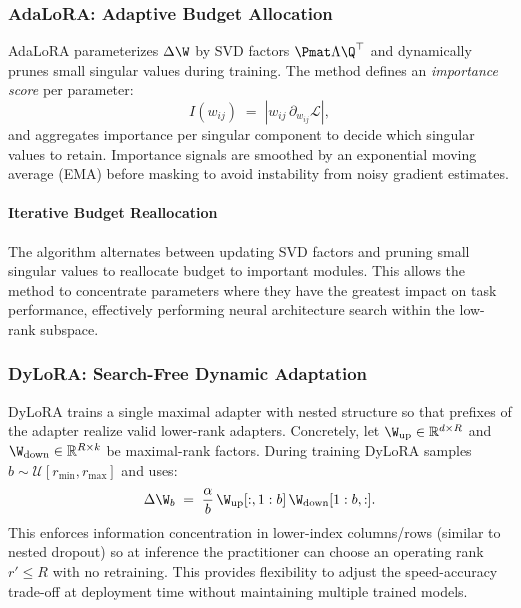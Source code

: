 \subsubsection{AdaLoRA: Adaptive Budget Allocation  \cite{zhang2023adalora}}
\label{subsubsec:adalora}

AdaLoRA parameterizes $\Delta\W$ by SVD factors $\Pmat\Lambda\Q^\top$ and dynamically prunes small singular values during training. The method defines an \emph{importance score} per parameter:
\begin{equation}
  I(w_{ij}) \;=\; | w_{ij}\,\partial_{w_{ij}}\mathcal{L} |,
\end{equation}
and aggregates importance per singular component to decide which singular values to retain. Importance signals are smoothed by an exponential moving average (EMA) before masking to avoid instability from noisy gradient estimates.

\paragraph{Iterative Budget Reallocation}
The algorithm alternates between updating SVD factors and pruning small singular values to reallocate budget to important modules. This allows the method to concentrate parameters where they have the greatest impact on task performance, effectively performing neural architecture search within the low-rank subspace.

\subsubsection{DyLoRA: Search-Free Dynamic Adaptation \cite{valipour2022dylora}}
\label{subsubsec:dylora}

DyLoRA trains a single maximal adapter with nested structure so that prefixes of the adapter realize valid lower-rank adapters. Concretely, let $\W_{\text{up}}\in\mathbb{R}^{d\times R}$ and $\W_{\text{down}}\in\mathbb{R}^{R\times k}$ be maximal-rank factors. During training DyLoRA samples $b\sim\mathcal{U}[r_{\min},r_{\max}]$ and uses:
\begin{equation}
  \Delta\W_b \;=\; \frac{\alpha}{b}\,\W_{\text{up}}[:,1:b]\,\W_{\text{down}}[1:b,:].
\end{equation}
This enforces information concentration in lower-index columns/rows (similar to nested dropout) so at inference the practitioner can choose an operating rank $r'\le R$ with no retraining. This provides flexibility to adjust the speed-accuracy trade-off at deployment time without maintaining multiple trained models.


